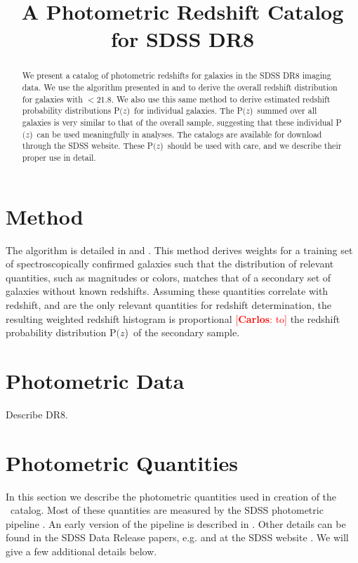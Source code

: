 \documentclass[preprint]{aastex}
\newcommand{\rmax}{21.8}
\newcommand{\pofz}{P$(z$)}
\newcommand{\cc}[1]{\textcolor{red}{[{\bf Carlos}: #1]}}
\begin{document}
\title{A Photometric Redshift Catalog for SDSS DR8}



\begin{abstract}

We present a catalog of photometric redshifts for galaxies in the SDSS DR8
imaging data.  We use the algorithm presented in \citet{LimaPhotoz08} and
\citet{CunhaPhotoz09} to derive the overall redshift distribution for galaxies
with \rmag$ < $\rmax.  We also use this same method to derive estimated
redshift probability distributions \pofz\ for individual galaxies.  The \pofz\
summed over all galaxies is very similar to that of the overall sample,
suggesting that these individual \pofz\ can be used meaningfully in analyses.
The catalogs are available for download through the SDSS website.  These \pofz\
should be used with care, and we describe their proper use in detail.

\end{abstract}

\section{Method} \label{sec:method}

The algorithm is detailed in \citet{LimaPhotoz08} and \citet{CunhaPhotoz09}.
This method derives weights for a training set of spectroscopically confirmed
galaxies such that the distribution of relevant quantities, such as magnitudes
or colors, matches that of a secondary set of galaxies without known redshifts.
Assuming these quantities correlate with redshift, and are the only relevant
quantities for redshift determination, the resulting weighted redshift
histogram is proportional \cc{to} the redshift probability distribution \pofz\ of the
secondary sample. 


\section{Photometric Data}
Describe DR8.

\section{Photometric Quantities} \label{sec:photo}

In this section we describe the photometric quantities used in creation of the
\photoz\ catalog.  Most of these quantities are measured by the SDSS
photometric pipeline \photo. An early version of the pipeline is described in
\citet{LuptonADASS01}.  Other details can be found in the SDSS Data Release
papers, e.g. \citet{dr4} and at the SDSS website \citep{sdssorg}.  We will give
a few additional details below.
\end{document}
